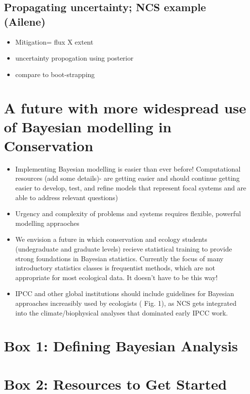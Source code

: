\documentclass{article}
\begin{document}
\subsection*{Propagating uncertainty; NCS example (Ailene)}
\begin{itemize}
\item Mitigation= flux X extent
\item uncertainty propogation using posterior
\item compare to boot-strapping 
\end{itemize}

\section* {A future with more widespread use of Bayesian modelling in Conservation}
\begin{itemize}
\item Implementing Bayesian modelling is easier than ever before! Computational resources (add some details)- are getting easier and should continue getting easier to develop, test, and refine models that represent focal systems and are able to address relevant questions)
\item Urgency and complexity of problems and systems requires flexible, powerful modelling appraoches 
\item We envision a future in which conservation and ecology students (undegraduate and graduate levels) recieve statistical training to provide strong foundations in Bayesian statistics. Currently the focus of many introductory statistics classes is frequentist methods, which are not appropriate for most ecological data. It doesn't have to be this way! 
\item IPCC and other global institutions should include guidelines for Bayesian approaches increasibly used by ecologists ( Fig. 1), as NCS gets integrated into the climate/biophysical analyses that dominated early IPCC work.
\end{itemize}

\par 
\section* {Box 1: Defining Bayesian Analysis}

\section* {Box 2: Resources to Get Started}
\end{document}
